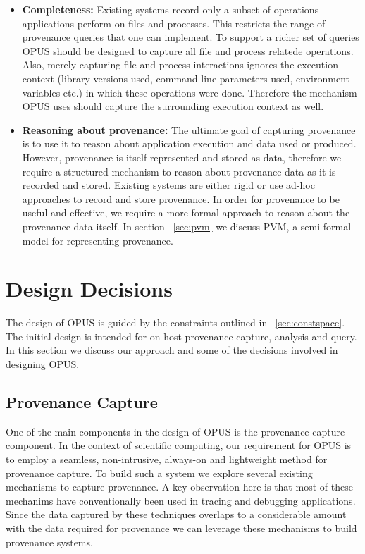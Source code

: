 \documentclass[withindex,glossary]{cam-thesis}
\begin{document}
\begin{itemize}
\item \textbf{Completeness:} 
Existing systems record only a subset of operations applications perform on files and processes. This restricts the range of provenance queries that one can implement. To support a richer set of queries OPUS should be designed to capture all file and process relatede operations. Also, merely capturing file and process interactions ignores the execution context (library versions used, command line parameters used, environment variables etc.) in which these operations were done. Therefore the mechanism OPUS uses should capture the surrounding execution context as well. 

\item \textbf{Reasoning about provenance:} 
The ultimate goal of capturing provenance is to use it to reason about application execution and data used or produced. However, provenance is itself represented and stored as data, therefore we require a structured mechanism to reason about provenance data as it is recorded and stored. Existing systems are either rigid or use ad-hoc approaches to record and store provenance. In order for provenance to be useful and effective, we require a more formal approach to reason about the provenance data itself. In section ~\ref{sec:pvm} we discuss PVM, a semi-formal model for representing provenance.

\end{itemize}

\section{Design Decisions} 
The design of OPUS is guided by the constraints outlined in ~\ref{sec:constspace}.
The initial design is intended for on-host provenance capture, analysis and query.
In this section we discuss our approach and some of the decisions involved in designing OPUS.


\subsection{Provenance Capture}
One of the main components in the design of OPUS is the provenance capture component.
In the context of scientific computing, our requirement for OPUS is to employ a seamless, non-intrusive, always-on and lightweight method for provenance capture.
To build such a system we explore several existing mechanisms to capture provenance.
A key observation here is that most of these mechanims have conventionally been used in tracing and debugging applications.
Since the data captured by these techniques overlaps to a considerable amount with the data required for provenance we can leverage these mechanisms to build provenance systems.
\end{document}
